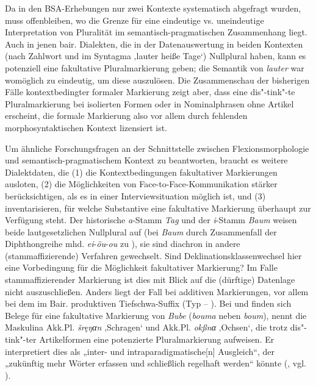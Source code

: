 Da in den BSA-Erhebungen nur zwei Kontexte systematisch abgefragt wurden, muss offenbleiben, wo die Grenze für eine eindeutige vs. uneindeutige Interpretation von Pluralität im semantisch-pragmatischen Zusammenhang liegt. Auch in jenen bair. Dialekten, die in der Datenauswertung in beiden Kontexten (nach Zahlwort und im Syntagma ‚lauter heiße Tage‘) Nullplural haben, kann es potenziell eine fakultative Pluralmarkierung geben; die Semantik von \textit{lauter} war womöglich zu eindeutig, um diese auszulösen. Die Zusammenschau der bisherigen Fälle kontextbedingter formaler Markierung zeigt aber, dass eine dis"-tink"-te Pluralmarkierung bei isolierten Formen oder in Nominalphrasen ohne Artikel erscheint, die formale Markierung also vor allem durch fehlenden morphosyntaktischen Kontext lizensiert ist.

Um ähnliche Forschungsfragen an der Schnittstelle zwischen Flexionsmorphologie und semantisch-pragmatischem Kontext zu beantworten, braucht es weitere Dialektdaten, die (1) die Kontextbedingungen fakultativer Markierungen ausloten, (2) die Möglichkeiten von Face-to-Face-Kommunikation stärker berücksichtigen, als es in einer Interviewsituation möglich ist, und (3) inventarisieren, für welche Substantive eine fakultative Markierung überhaupt zur Verfügung steht. Der historische \textit{a}{}-Stamm \textit{Tag} und der \textit{i}{}-Stamm \textit{Baum} weisen beide lautgesetzlichen Nullplural auf (bei \textit{Baum} durch Zusammenfall der Diphthongreihe mhd. \textit{ei}{}-\textit{öu}{}-\textit{ou} zu ), sie sind diachron in andere (stammaffizierende) Verfahren gewechselt. Sind Deklinationsklassenwechsel hier eine Vorbedingung für die Möglichkeit fakultativer Markierung? Im Falle stammaffizierender Markierung ist dies mit Blick auf die (dürftige) Datenlage nicht auszuschließen. Anders liegt der Fall bei additiven Markierungen, vor allem bei dem im Bair. produktiven Tiefschwa-Suffix (Typ  -- ). Bei \citet[138]{Rowley1997} und \citet[123]{Steininger1994} finden sich Belege für eine fakultative Markierung von \textit{Bube} (\textit{bouma} neben \textit{boum}), \citet[149]{Wildfeuer2001} nennt die Maskulina Akk.Pl. \textit{šręŋαn} ‚Schragen‘ und Akk.Pl. \textit{okßnα} ‚Ochsen‘, die trotz dis"-tink"-ter Artikelformen eine potenzierte Pluralmarkierung aufweisen. Er interpretiert dies als „inter- und intraparadigmatische[n] Ausgleich“, der „zukünftig mehr Wörter erfassen und schließlich regelhaft werden“ könnte (\citealt[149]{Wildfeuer2001}, vgl. \citealt[72]{Mauser2007}).

